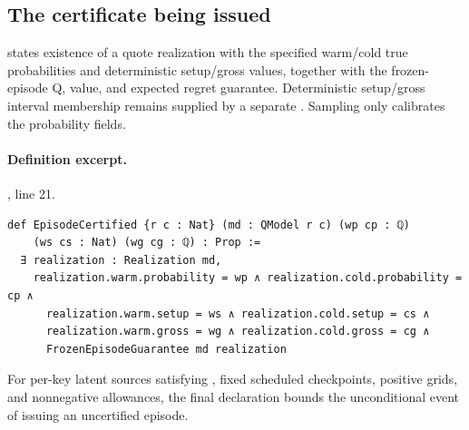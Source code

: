 \documentclass[11pt]{article}
\begin{document}
\subsection{The certificate being issued}
 states existence of a quote realization with the
specified warm/cold true probabilities and deterministic setup/gross values,
together with the frozen-episode Q, value, and expected regret guarantee.
Deterministic setup/gross interval membership remains supplied by a separate
. Sampling only calibrates the probability
fields.

\paragraph{Definition excerpt.}, line 21.
\begin{lstlisting}[style=AVOCSource]
def EpisodeCertified {r c : Nat} (md : QModel r c) (wp cp : ℚ)
    (ws cs : Nat) (wg cg : ℚ) : Prop :=
  ∃ realization : Realization md,
    realization.warm.probability = wp ∧ realization.cold.probability = cp ∧
      realization.warm.setup = ws ∧ realization.cold.setup = cs ∧
      realization.warm.gross = wg ∧ realization.cold.gross = cg ∧
      FrozenEpisodeGuarantee md realization
\end{lstlisting}


For per-key latent sources satisfying , fixed scheduled
checkpoints, positive grids, and nonnegative allowances, the final declaration
bounds the unconditional event of issuing an uncertified episode.
\end{document}
